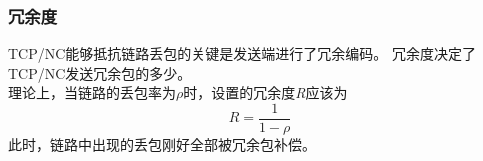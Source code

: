 \begin{frame}
	\frametitle{冗余度}
	TCP/NC能够抵抗链路丢包的关键是发送端进行了冗余编码。
	冗余度决定了TCP/NC发送冗余包的多少。
	\\
	理论上，当链路的丢包率为$\rho$时，设置的冗余度\emph{R}应该为
	\begin{equation}\label{eq:redundancy}
	R=\dfrac{1}{1 - \rho}
	\end{equation}
	此时，链路中出现的丢包刚好全部被冗余包补偿。
\end{frame}


%
%
